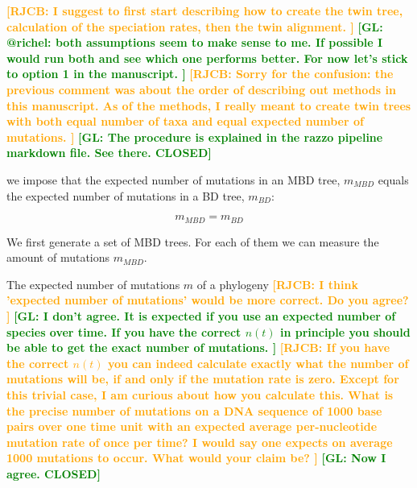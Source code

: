\documentclass{article}
\newcommand*\richel[1]{\textcolor{orange}{\textbf{[RJCB: #1]}}}
\newcommand*\gio[1]{\textcolor{green}{\textbf{[GL: #1]}}}
\begin{document}
\begin{itemize}

\richel{
  I suggest to first start describing how to create the twin tree,
  calculation of the speciation rates, then the twin alignment.
}
\gio{@richel: both assumptions seem to make sense to me. 
  If possible I would run both and see which one performs better. For now
  let's stick to option 1 in the manuscript.
}
\richel{
  Sorry for the confusion: the previous comment was about the order
  of describing out methods in this manuscript. As of the methods,  
  I really meant to create twin trees with 
  both equal number of taxa and equal expected number of mutations.
}
\gio{The procedure is explained in the razzo pipeline markdown file. See there. CLOSED}
  
we impose
that the expected number of mutations in an MBD tree, $m_{MBD}$ equals
the expected number of mutations in a BD tree, $m_{BD}$:

\begin{equation}
m_{MBD} = m_{BD} \label{m equivalence}
\end{equation} 

We first generate a set of MBD trees. For each of them we can measure the amount of mutations $m_{MBD}$.

The expected number of mutations $m$ of a phylogeny 
\richel{
  I think 'expected number of mutations' would be more correct.
  Do you agree?
}
\gio{
  I don't agree. It is expected if you use an expected number 
  of species over time. If you have the correct $n(t)$ in principle you 
  should be able to get the exact number of mutations.
}
\richel{
  If you have the correct $n(t)$ you can indeed calculate exactly what
  the number of mutations will be, if and only if the mutation rate is
  zero. Except for this trivial case, I am curious about how you
  calculate this. What is the precise number of mutations on a DNA
  sequence of 1000 base pairs over one time unit with an 
  expected average per-nucleotide
  mutation rate of once per time? I would say one expects on average 1000 mutations
  to occur. What would your claim be?
}
\gio{Now I agree. CLOSED}


\end{itemize}
\end{document}
